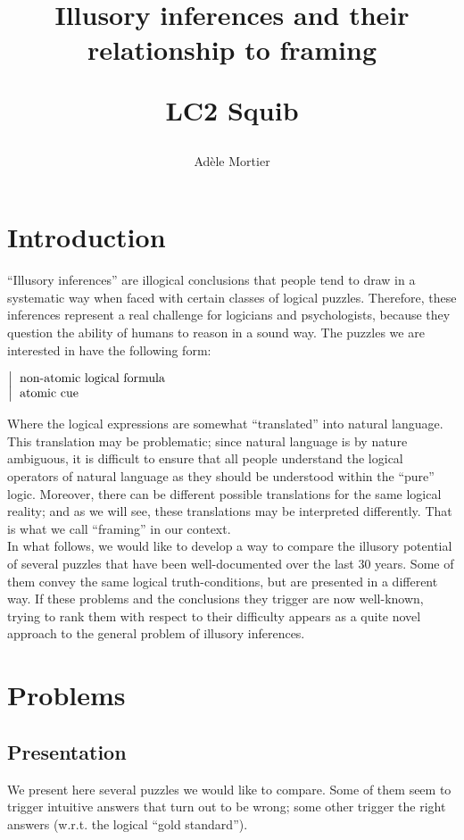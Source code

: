 \documentclass[french]{article}
\title{Illusory inferences and their relationship to framing \\  \begin{large}
		LC2 Squib
\end{large}}
\author{Adèle Mortier}
\date{}
\begin{document}
	\nocite{*}
\maketitle
\section*{Introduction}
``Illusory inferences'' \cite{johnsonlaird1999} are illogical conclusions that people tend to draw in a systematic way when faced with certain classes of logical puzzles. Therefore, these inferences represent a real challenge for logicians and psychologists, because they question the ability of humans to reason in a sound way. The puzzles we are interested in have the following form:
\begin{center}
	$\left |
	\begin{tabular}{l}
	non-atomic logical formula\\
	atomic cue
\end{tabular}\right.$
\end{center}
Where the logical expressions are somewhat ``translated'' into natural language. This translation may be problematic; since natural language is by nature ambiguous, it is difficult to ensure that all people understand the logical operators of natural language as they should be understood within the ``pure'' logic. Moreover, there can be different possible translations for the same logical reality; and as we will see, these translations may be interpreted differently. That is what we call ``framing'' in our context.\\
In what follows, we would like to develop a way to compare the illusory potential of several puzzles that have been well-documented over the last 30 years. Some of them convey the same logical truth-conditions, but are presented in a different way. If these problems and the conclusions they trigger are now well-known, trying to rank them with respect to their difficulty appears as a quite novel approach to the general problem of illusory inferences.
\section{Problems}
\subsection{Presentation}
We present here several puzzles we would like to compare. Some of them seem to trigger intuitive answers that turn out to be wrong; some other trigger the right answers (w.r.t. the logical ``gold standard'').\\
\end{document}
